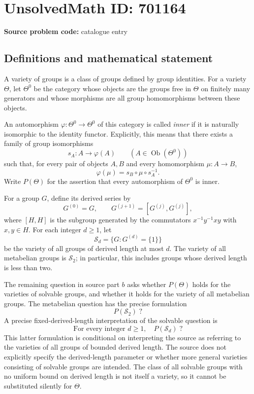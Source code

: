 \documentclass[11pt]{article}
\begin{document}
\section*{UnsolvedMath ID: 701164}
\textbf{Source problem code:} catalogue entry
\subsection{Definitions and mathematical statement}
A variety of groups is a class of groups defined by group identities. For a variety \(\Theta\), let \(\Theta^0\) be the category whose objects are the groups free in \(\Theta\) on finitely many generators and whose morphisms are all group homomorphisms between these objects.

An automorphism \(\varphi:\Theta^0\to\Theta^0\) of this category is called \emph{inner} if it is naturally isomorphic to the identity functor. Explicitly, this means that there exists a family of group isomorphisms
\[
 s_A:A\longrightarrow\varphi(A)
 \qquad(A\in\operatorname{Ob}(\Theta^0))
\]
such that, for every pair of objects \(A,B\) and every homomorphism \(\mu:A\to B\),
\[
 \varphi(\mu)=s_B\circ\mu\circ s_A^{-1}.
\]
Write \(P(\Theta)\) for the assertion that every automorphism of \(\Theta^0\) is inner.

For a group \(G\), define its derived series by
\[
 G^{(0)}=G,\qquad G^{(j+1)}=[G^{(j)},G^{(j)}],
\]
where \([H,H]\) is the subgroup generated by the commutators \(x^{-1}y^{-1}xy\) with \(x,y\in H\). For each integer \(d\geq1\), let
\[
 \mathcal S_d=\{G:G^{(d)}=\{1\}\}
\]
be the variety of all groups of derived length at most \(d\). The variety of all metabelian groups is \(\mathcal S_2\); in particular, this includes groups whose derived length is less than two.

The remaining question in source part \(b\) asks whether \(P(\Theta)\) holds for the varieties of solvable groups, and whether it holds for the variety of all metabelian groups. The metabelian question has the precise formulation
\[
 P(\mathcal S_2)\;?
\]
A precise fixed-derived-length interpretation of the solvable question is
\[
 \text{For every integer }d\geq1,\quad P(\mathcal S_d)\;?
\]
This latter formulation is conditional on interpreting the source as referring to the varieties of all groups of bounded derived length. The source does not explicitly specify the derived-length parameter or whether more general varieties consisting of solvable groups are intended. The class of all solvable groups with no uniform bound on derived length is not itself a variety, so it cannot be substituted silently for \(\Theta\).
\end{document}
